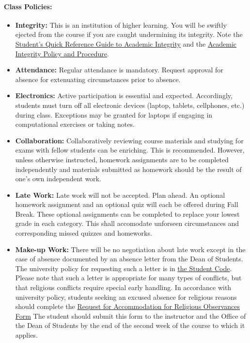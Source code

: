 \documentclass[11pt, a4paper]{article}
\begin{document}
\paragraph{Class Policies:}  

\begin{itemize}
\item[] \textbf{Integrity:} This is an institution of higher
learning. You will be swiftly ejected from the course if you are caught
undermining its integrity. Note the
\href{http://www.provost.illinois.edu/academicintegrity/students.html}{Student's
Quick Reference Guide to Academic Integrity} and the
\href{http://studentcode.illinois.edu/article1_part4_1-401.html}{Academic
Integrity Policy and Procedure}.  
\item[] \textbf{Attendance:} Regular attendance is mandatory. Request approval for absence for extenuating circumstances prior to absence.
\item[] \textbf{Electronics:} Active participation is essential and expected. 
        Accordingly, students must turn off all electronic devices (laptop, 
        tablets, cellphones, etc.) during class. Exceptions may be granted for 
        laptops if engaging in computational exercises or taking notes. 
\item[] \textbf{Collaboration:} Collaboratively reviewing course materials and studying for exams with fellow students can be enriching.  This is recommended.  However, unless otherwise instructed, homework assignments are to be completed independently and materials submitted as homework should be the result of one's own independent work.
\item[] \textbf{Late Work:} Late work will not be accepted. Plan ahead. 
        An optional homework assignment and an optional quiz will each be 
        offered during Fall Break. These optional assignments can be completed to 
        replace your lowest grade in each category. This shall accomodate 
        unforseen circumstances and corresponding missed quizzes and homeworks.

\item[] \textbf{Make-up Work:} There will be no negotiation about late work 
        except in the case of absence documented by an absence letter from the 
        Dean of Students.  The university policy for requesting such a letter 
        is in 
        \href{http://studentcode.illinois.edu/article1_part5_1-501.html}{the 
        Student Code}. Please note that such a letter is appropriate for many 
        types of conflicts, but that religious conflicts require special early 
        handling. In accordance with university policy, students seeking an 
        excused absence for religious reasons should complete the 
	\href{http://odos.illinois.edu/community-of-care/resources/students/religious-observances/}{Request for Accommodation for Religious Observances Form} 
        The student should submit this
        form to the instructor and the Office of the Dean of Students by the end of the
        second week of the course to which it applies. 



\end{itemize}
\end{document}
